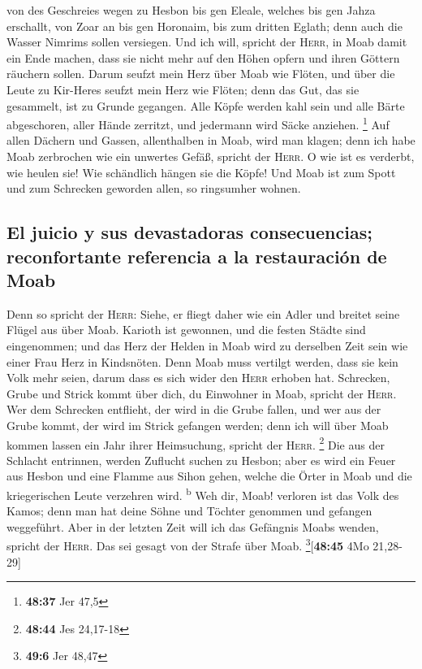  von des Geschreies wegen zu Hesbon bis gen Eleale,
welches bis gen Jahza erschallt, von Zoar an bis gen Horonaim, bis zum
dritten Eglath; denn auch die Wasser Nimrims sollen versiegen.
 Und ich will, spricht der \textsc{Herr}, in Moab damit
ein Ende machen, dass sie nicht mehr auf den Höhen opfern und ihren
Göttern räuchern sollen.  Darum seufzt mein Herz über
Moab wie Flöten, und über die Leute zu Kir-Heres seufzt mein Herz wie
Flöten; denn das Gut, das sie gesammelt, ist zu Grunde gegangen.
 Alle Köpfe werden kahl sein und alle Bärte abgeschoren,
aller Hände zerritzt, und jedermann wird Säcke anziehen. \footnote{\textbf{48:37}
  Jer 47,5}  Auf allen Dächern und Gassen, allenthalben
in Moab, wird man klagen; denn ich habe Moab zerbrochen wie ein unwertes
Gefäß, spricht der \textsc{Herr}.  O wie ist es verderbt,
wie heulen sie! Wie schändlich hängen sie die Köpfe! Und Moab ist zum
Spott und zum Schrecken geworden allen, so ringsumher wohnen.

\hypertarget{el-juicio-y-sus-devastadoras-consecuencias-reconfortante-referencia-a-la-restauraciuxf3n-de-moab}{%
\subsection{El juicio y sus devastadoras consecuencias; reconfortante
referencia a la restauración de
Moab}\label{el-juicio-y-sus-devastadoras-consecuencias-reconfortante-referencia-a-la-restauraciuxf3n-de-moab}}

 Denn so spricht der \textsc{Herr}: Siehe, er fliegt
daher wie ein Adler und breitet seine Flügel aus über Moab.
 Karioth ist gewonnen, und die festen Städte sind
eingenommen; und das Herz der Helden in Moab wird zu derselben Zeit sein
wie einer Frau Herz in Kindsnöten.  Denn Moab muss
vertilgt werden, dass sie kein Volk mehr seien, darum dass es sich wider
den \textsc{Herr} erhoben hat.  Schrecken, Grube und
Strick kommt über dich, du Einwohner in Moab, spricht der \textsc{Herr}.
 Wer dem Schrecken entflieht, der wird in die Grube
fallen, und wer aus der Grube kommt, der wird im Strick gefangen werden;
denn ich will über Moab kommen lassen ein Jahr ihrer Heimsuchung,
spricht der \textsc{Herr}. \footnote{\textbf{48:44} Jes 24,17-18}
 Die aus der Schlacht entrinnen, werden Zuflucht suchen
zu Hesbon; aber es wird ein Feuer aus Hesbon und eine Flamme aus Sihon
gehen, welche die Örter in Moab und die kriegerischen Leute verzehren
wird. \textsuperscript{b}  Weh dir, Moab! verloren ist
das Volk des Kamos; denn man hat deine Söhne und Töchter genommen und
gefangen weggeführt.  Aber in der letzten Zeit will ich
das Gefängnis Moabs wenden, spricht der \textsc{Herr}. Das sei gesagt
von der Strafe über Moab. \footnote{\textbf{49:6} Jer 48,47}{[}\textbf{48:45}
4Mo 21,28-29{]}

